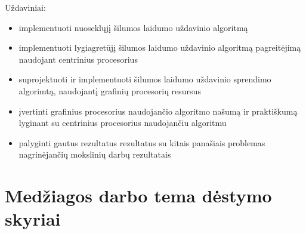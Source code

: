 \documentclass{VUMIFPSbakalaurinis}
\begin{document}



Uždaviniai:
\begin{itemize}
    \item implementuoti nuoseklųjį šilumos laidumo uždavinio algoritmą
    \item implementuoti lygiagretūjį šilumos laidumo uždavinio algoritmą pagreitėjimą naudojant centrinius procesorius
    \item suprojektuoti ir implementuoti šilumos laidumo uždavinio sprendimo algorimtą, naudojantį grafinių procesorių resursus
    \item įvertinti grafinius procesorius naudojančio algoritmo našumą ir praktiškumą lyginant su centrinius procesorius naudojančiu algoritmu
    \item palyginti gautus rezultatus rezultatus su kitais panašiais problemas nagrinėjančių mokslinių darbų rezultatais
\end{itemize}

\section{Medžiagos darbo tema dėstymo skyriai}
\end{document}
